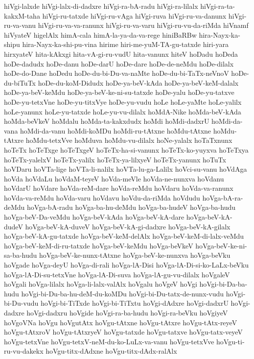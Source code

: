 {hiVgi-lalxde
hiVgi-lalx-di-dadxre
hiVgi-ra-bA-radu
hiVgi-ra-lilalx
hiVgi-ra-ta-kakxM-taha
hiVgi-ru-tatxde
hiVgi-ru-vAga
hiVgi-ruva
hiVgi-ru-va-danunx
hiVgi-ru-va-vanu
hiVgi-ru-va-va-ranunx
hiVgi-ru-va-varu
hiVgi-ru-vu-da-riMda
hiVnamf
hiVyateV
higelAlx
himA-cala
himA-la-ya-da-va-rege
hiniBaRBw
hira-Nayx-ka-shipu
hira-Nayx-ka-shi-pu-vina
hirime
hiri-me-yuM-TA-gu-tatxde
hiri-yara
hirxyateV
hita-kAkxgi
hita-vA-gi-ru-vudU
hita-vanunx
hiteV
hoDadu
hoDeda
hoDe-dadudx
hoDe-danu
hoDe-darU
hoDe-dare
hoDe-de-neMdu
hoDe-dilalx
hoDe-do-Dane
hoDedu
hoDe-du-bi-Du-va-naMte
hoDe-du-bi-TaTx-neVnoV
hoDe-du-biTuTx
hoDe-du-koM-Didudx
hoDe-ya-beV-kAda
hoDe-ya-beV-keM-dalalx
hoDe-ya-beV-keMdu
hoDe-ya-beV-ke-ni-su-tatxde
hoDe-yalu
hoDe-yu-tatxve
hoDe-yu-tetxVne
hoDe-yu-titxVye
hoDe-yu-vudu
hoLe
hoLe-yaMte
hoLe-yalilx
hoLe-yanunx
hoLe-yu-tatxde
hoLe-yu-vu-dilalx
hoMdA-Nike
hoMda-beV-kAda
hoMda-beVkeV
hoMdalu
hoMda-ta-kakxdudx
hoMdi
hoMdi-dadxrU
hoMdi-da-vana
hoMdi-da-vanu
hoMdi-koMDu
hoMdi-ru-tAtxne
hoMdu-tAtxne
hoMdu-tAtxre
hoMdu-tetxVve
hoMduva
hoMdu-vu-dilalx
hoNe-yalalx
hoTaTxnunx
hoTeTx
hoTeTxge
hoTeTxgeV
hoTeTx-ha-si-vanunx
hoTeTx-ko-yuyxva
hoTeTxya
hoTeTx-yalelxV
hoTeTx-yalilx
hoTeTx-ya-lilxyeV
hoTeTx-yanunx
hoTuTx
hoVDaru
hoVTa-lige
hoVTa-li-nalilx
hoVTa-lu-ga-Lalilx
hoVci-su-vanu
hoVdAga
hoVda
hoVdaLu
hoVdaM-teyeV
hoVda-meVle
hoVda-ne-nunxva
hoVdanu
hoVdarU
hoVdare
hoVda-reM-dare
hoVda-reMdu
hoVdaru
hoVda-va-ranunx
hoVda-va-reMdu
hoVda-varu
hoVdavu
hoVdu-da-riMda
hoVdudu
hoVga-bA-ra-deMdu
hoVga-bA-radu
hoVga-ba-hu-deMdu
hoVga-ba-hudeV
hoVga-ba-hudu
hoVga-beV-Da-veMdu
hoVga-beV-kAda
hoVga-beV-kA-dare
hoVga-beV-kA-dudeV
hoVga-beV-kA-duveV
hoVga-beV-kA-gi-dadxre
hoVga-beV-kA-gilalx
hoVga-beV-kA-gu-tatxde
hoVga-beV-keM-delAlx
hoVga-beV-keM-di-lalx-veMdu
hoVga-beV-keM-di-ru-tatxde
hoVga-beV-keMdu
hoVga-beVkeV
hoVga-beV-ke-ni-sa-ba-hudu
hoVga-beV-ke-nunx-tAtxne
hoVga-beV-ke-nunxva
hoVga-beVku
hoVgade
hoVga-deyU
hoVga-di-rali
hoVga-lA-Disi
hoVga-lA-Di-si-ko-LaLx-beVku
hoVga-lA-Di-su-tetxVne
hoVga-lA-Di-suva
hoVga-lA-gu-vu-dilalx
hoVgaleV
hoVgali
hoVga-lilalx
hoVga-li-lalx-valAlx
hoVgalu
hoVgeV
hoVgi
hoVgi-bi-Da-ba-hudu
hoVgi-bi-Du-ba-hu-deM-du-koMDu
hoVgi-bi-Du-tatx-de-nunx-vudu
hoVgi-bi-Du-vudu
hoVgi-bi-TiTxde
hoVgi-bi-TiTxtu
hoVgi-dAdxre
hoVgi-dadxrU
hoVgi-dadxre
hoVgi-dadxru
hoVgide
hoVgi-ra-ba-hudu
hoVgi-ra-beVku
hoVgiyeV
hoVgoVNa
hoVgu
hoVgutAtx
hoVgu-tAtxne
hoVgu-tAtxre
hoVgu-tAtx-reyeV
hoVgu-tAtxroV
hoVgu-tAtxryeV
hoVgu-tatxde
hoVgu-tatxve
hoVgu-tatx-veyeV
hoVgu-tetxVne
hoVgu-tetxV-neM-du-ko-LuLx-va-vanu
hoVgu-tetxVve
hoVgu-ti-ru-vu-dakekx
hoVgu-titx-dAdxne
hoVgu-titx-dAdx-ralAlx
}
